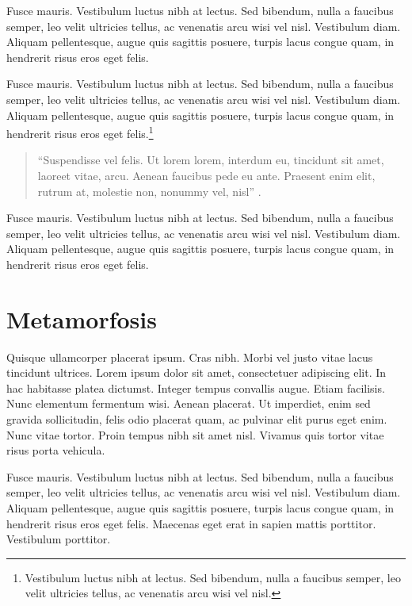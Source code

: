 Fusce mauris. Vestibulum luctus nibh at lectus. Sed bibendum, nulla a faucibus semper, leo velit ultricies tellus, ac venenatis arcu wisi vel nisl. Vestibulum diam. Aliquam pellentesque, augue quis sagittis posuere, turpis lacus congue quam, in hendrerit risus eros eget felis.

Fusce mauris. Vestibulum luctus nibh at lectus. Sed bibendum, nulla a faucibus semper, leo velit ultricies tellus, ac venenatis arcu wisi vel nisl. Vestibulum diam. Aliquam pellentesque, augue quis sagittis posuere, turpis lacus congue quam, in hendrerit risus eros eget felis.\footnote{Vestibulum luctus nibh at lectus. Sed bibendum, nulla a faucibus semper, leo velit ultricies tellus, ac venenatis arcu wisi vel nisl.}

\begin{quote}
	\enquote{Suspendisse vel felis. Ut lorem lorem, interdum eu, tincidunt sit amet, laoreet vitae, arcu. Aenean faucibus pede eu ante. Praesent enim elit, rutrum at, molestie non, nonummy vel, nisl} \parencite{@3189-QUIROGA2017}.
\end{quote}

Fusce mauris. Vestibulum luctus nibh at lectus. Sed bibendum, nulla a faucibus semper, leo velit ultricies tellus, ac venenatis arcu wisi vel nisl. Vestibulum diam. Aliquam pellentesque, augue quis sagittis posuere, turpis lacus congue quam, in hendrerit risus eros eget felis.

\chapter{Metamorfosis}

Quisque ullamcorper placerat ipsum. Cras nibh. Morbi vel justo vitae lacus tincidunt ultrices. Lorem ipsum dolor sit amet, consectetuer adipiscing elit. In hac habitasse platea dictumst. Integer tempus convallis augue. Etiam facilisis. Nunc elementum fermentum wisi. Aenean placerat. Ut imperdiet, enim sed gravida sollicitudin, felis odio placerat quam, ac pulvinar elit purus eget enim. Nunc vitae tortor. Proin tempus nibh sit amet nisl. Vivamus quis tortor vitae risus porta vehicula.

Fusce mauris. Vestibulum luctus nibh at lectus. Sed bibendum, nulla a faucibus semper, leo velit ultricies tellus, ac venenatis arcu wisi vel nisl. Vestibulum diam. Aliquam pellentesque, augue quis sagittis posuere, turpis lacus congue quam, in hendrerit risus eros eget felis. Maecenas eget erat in sapien mattis porttitor. Vestibulum porttitor.


